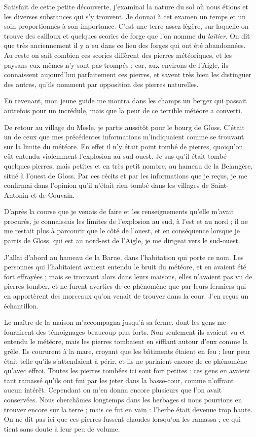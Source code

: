 \documentclass[a4paper, 11pt, oneside, polutonikogreek, french]{article}
\begin{document}
Satisfait de cette petite découverte, j'examinai la nature du sol où nous étions et les diverses substances qui s'y trouvent. Je donnai à cet examen un temps et un soin proportionnés à son importance. C'est une terre assez légère, sur laquelle on trouve des cailloux et quelques scories de forge que l'on nomme du \emph{laitier}. On dit que très anciennement il y a eu dans ce lieu des forges qui ont été abandonnées. Au reste on sait combien ces scories diffèrent des pierres météoriques, et les paysans eux-mêmes n'y sont pas trompés ; car, aux environs de l'Aigle, ils connaissent aujourd'hui parfaitement ces pierres, et savent très bien les distinguer des autres, qu'ils nomment par opposition des pierres naturelles.

En revenant, mon jeune guide me montra dans les champs un berger qui passait autrefois pour un incrédule, mais que la peur de ce terrible météore a converti.

De retour au village du Mesle, je partis aussitôt pour le bourg de Gloss. C'était un de ceux que mes précédentes informations m'indiquaient comme se trouvant sur la limite du météore. En effet il n'y était point tombé de pierres, quoiqu'on eût entendu violemment l'explosion au sud-ouest. Je sus qu'il était tombé quelques pierres, mais petites et en très petit nombre, au hameau de la Belangère, situé à l'ouest de Gloss. Par ces récits et par les informations que je reçus, je me confirmai dans l'opinion qu'il n'était rien tombé dans les villages de Saint-Antonin et de Couvain.

D'après la course que je venais de faire et les renseignements qu'elle m'avait procurés, je connaissais les limites de l'explosion au sud, à l'est et au nord ; il ne me restait plus à parcourir que le côté de l'ouest, et en conséquence lorsque je partis de Gloss, qui est au nord-est de l'Aigle, je me dirigeai vers le sud-ouest.

J'allai d'abord au hameau de la Barne, dans l'habitation qui porte ce nom. Les personnes qui l'habitaient avaient entendu le bruit du météore, et en avaient été fort effrayées ; mais se trouvant alors dans leurs maisons, elles n'avaient pas vu de pierres tomber, et ne furent averties de ce phénomène que par leurs fermiers qui en apportèrent des morceaux qu'on venait de trouver dans la cour. J'en reçus un échantillon.

Le maître de la maison m'accompagna jusqu'à sa ferme, dont les gens me fournirent des témoignages beaucoup plus forts. Non seulement ils avaient vu et entendu le météore, mais les pierres tombaient en sifflant autour d'eux comme la grêle. Ils coururent à la mare, croyant que les bâtiments étaient en feu ; leur peur était telle qu'ils s'attendaient à périr, et ils ne parlaient encore de ce phénomène qu'avec effroi. Toutes les pierres tombées ici sont fort petites : ces gens en avaient tant ramassé qu'ils ont fini par les jeter dans la basse-cour, comme n'offrant aucun intérêt. Cependant on m'en donna encore plusieurs que l'on avait conservées. Nous cherchâmes longtemps dans les herbages si nous pourrions en trouver encore sur la terre ; mais ce fut en vain : l'herbe était devenue trop haute. On ne dit pas ici que ces pierres fussent chaudes lorsqu'on les ramassa ; ce qui tient sans doute à leur peu de volume.
\end{document}
